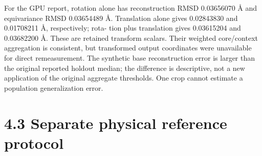 \documentclass[11pt]{article}
\begin{document}
For the GPU report, rotation alone has reconstruction RMSD 0.03656070 Å and equivariance
RMSD 0.03654489 Å. Translation alone gives 0.02843830 and 0.01708211 Å, respectively; rota-
tion plus translation gives 0.03615204 and 0.03682200 Å. These are retained transform scalars.
Their weighted core/context aggregation is consistent, but transformed output coordinates were
unavailable for direct remeasurement. The synthetic base reconstruction error is larger than the
original reported holdout median; the difference is descriptive, not a new application of the original
aggregate thresholds. One crop cannot estimate a population generalization error.

\section*{4.3 Separate physical reference protocol}
\end{document}
